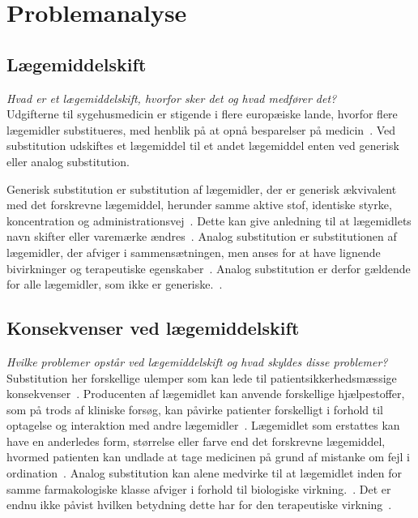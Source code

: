 \chapter{Problemanalyse}

\section{Lægemiddelskift}
\textit{Hvad er et lægemiddelskift, hvorfor sker det og hvad medfører det?} \\
Udgifterne til sygehusmedicin er stigende i flere europæiske lande, hvorfor flere lægemidler substitueres, med henblik på at opnå besparelser på medicin~\citep{Ess2003,Johnston2011}. Ved substitution udskiftes et lægemiddel til et andet lægemiddel enten ved generisk eller analog substitution.

Generisk substitution er substitution af lægemidler, der er  generisk ækvivalent med det forskrevne lægemiddel, herunder samme aktive stof, identiske styrke, koncentration og administrationsvej~\citep{DanskSelskabforPatientsikkerhed2009, Kairi2017}. Dette kan give anledning til at lægemidlets navn skifter eller varemærke ændres~\citep{Kairi2017}. Analog substitution er substitutionen af lægemidler, der afviger i sammensætningen, men anses for at have lignende bivirkninger og terapeutiske egenskaber~\citep{DanskSelskabforPatientsikkerhed2009, Kairi2017}. Analog substitution er derfor gældende for alle lægemidler, som ikke er generiske.~\citep{Kairi2017}.


\section{Konsekvenser ved lægemiddelskift} \label{sec:ProblemLaeg} %
\textit{Hvilke problemer opstår ved lægemiddelskift og hvad skyldes disse problemer?} \\
Substitution her forskellige ulemper som kan lede til patientsikkerhedsmæssige konsekvenser~\citep{DanskSelskabforPatientsikkerhed2009}. Producenten af lægemidlet kan anvende forskellige hjælpestoffer, som på trods af kliniske forsøg, kan påvirke patienter forskelligt i forhold til optagelse og interaktion med andre lægemidler~\citep{Kairi2017}. Lægemidlet som erstattes kan have en anderledes form, størrelse eller farve end det forskrevne lægemiddel, hvormed patienten kan undlade at tage medicinen på grund af mistanke om fejl i ordination~\citep{Kairi2017}. Analog substitution kan alene medvirke til at lægemidlet inden for samme farmakologiske klasse afviger i forhold til biologiske virkning.~\citep{Kairi2017}. Det er endnu ikke påvist hvilken betydning dette har for den terapeutiske virkning~\citep{Kairi2017}. 

